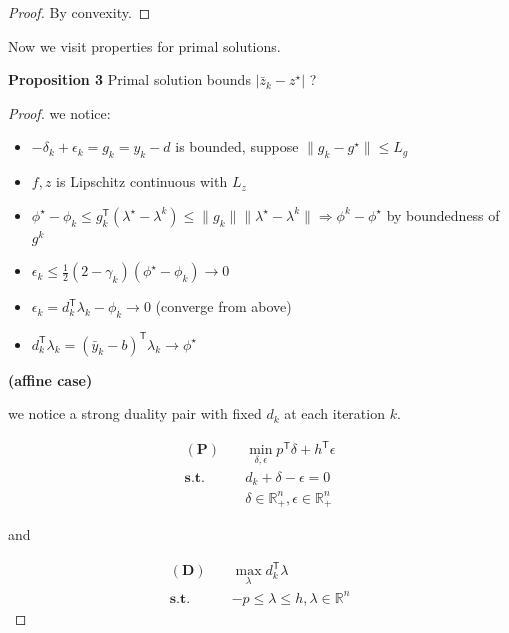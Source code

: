 \begin{proof}
  By convexity.
\end{proof}

Now we visit properties for primal solutions.

\textbf{Proposition 3} Primal solution bounds \(|\bar z_k - z^\star|\) ?

\begin{proof} we notice:
  \begin{itemize}
    \tightlist
    \item
          \(- \delta_k + \epsilon_k = g_k = y_k -d\) is bounded, suppose
          \(\|g_k - g^\star\|\le L_g\)
    \item
          \(f, z\) is Lipschitz continuous with \(L_z\)
    \item
          \(\phi^\star - \phi_k \le g_k^\mathsf{T} (\lambda^\star - \lambda^k)\le \|g_k\|\|\lambda^\star - \lambda^k\|\Rightarrow \phi^k -\phi^\star\)
          by boundedness of \(g^k\)
    \item
          \(\epsilon_k \le \frac{1}{2}(2 - \gamma_k) ( \phi^\star - \phi_k) \to 0\)
    \item
          \(\epsilon_k = d_k^\mathsf{T} \lambda_k - \phi_k \to 0\) (converge
          from above)
    \item
          \(d_k^\mathsf{T} \lambda_k = (\bar y_k - b)^\mathsf{T} \lambda_k \to \phi^\star\)
  \end{itemize}

  \textbf{(affine case)}

  we notice a strong duality pair with fixed \(d_k\) at each iteration
  \(k\).

  \begin{equation}
    \begin{aligned}
      \mathbf{(P)}  \quad & \min_{\delta, \epsilon} p^\mathsf{T} \delta + h^\mathsf{T} \epsilon \\
      \mathbf{s.t.} \quad & d_k + \delta - \epsilon = 0                                         \\
                          & \delta \in \mathbb{R}_+^n, \epsilon \in \mathbb{R}_+^n
    \end{aligned}
  \end{equation}

  and

  \begin{equation}
    \begin{aligned}
      \mathbf{(D)}  \quad & \max_{\lambda} d_k^\mathsf{T} \lambda          \\
      \mathbf{s.t.} \quad & -p \le \lambda \le h, \lambda \in \mathbb{R}^n
    \end{aligned}
  \end{equation}


\end{proof}

